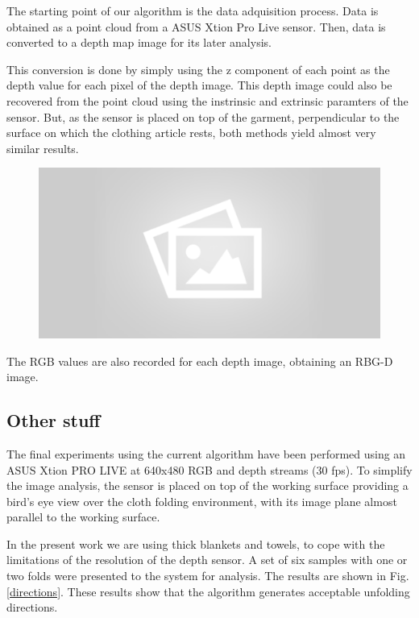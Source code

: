 The starting point of our algorithm is the data adquisition process. Data is obtained as a point cloud from a ASUS Xtion Pro Live sensor. Then, data is converted to a depth map image for its later analysis. 

This conversion is done by simply using the z component of each point as the depth value for each pixel of the depth image. This depth image could also be recovered from the point cloud using the instrinsic and extrinsic paramters of the sensor. But, as the sensor is placed on top of the garment, perpendicular to the surface on which the clothing article rests, both methods yield almost very similar results.

\begin{figure}[thpb]
    \centering
    \includegraphics[width=0.7
    \textwidth]{figures/placeholder2.png}
    \caption{}
    \label{fig:point_cloud_and_depth_image}
\end{figure}

The RGB values are also recorded for each depth image, obtaining an RBG-D image.

\subsection{Other stuff}

The final experiments using the current algorithm have been performed using an ASUS Xtion PRO LIVE at 640x480 RGB and depth streams (30 fps).
To simplify the image analysis, the sensor is placed on top of the working surface  providing a bird's eye view over the cloth folding environment, with its image plane almost parallel to the working surface.

In the present work we are using thick blankets and towels, to cope with the limitations of the resolution of the depth sensor. A set of six samples with one or two folds were presented to the system for analysis. The results are shown in Fig. \ref{directions}.
%
These results show that the algorithm generates acceptable unfolding directions.

